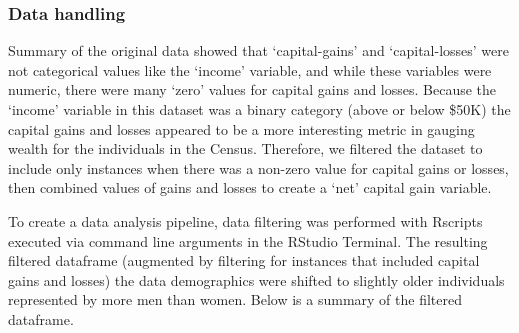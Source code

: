 \documentclass[]{article}
\begin{document}
\hypertarget{data-handling}{%
\subsubsection{Data handling}\label{data-handling}}

Summary of the original data showed that `capital-gains' and
`capital-losses' were not categorical values like the `income' variable,
and while these variables were numeric, there were many `zero' values
for capital gains and losses. Because the `income' variable in this
dataset was a binary category (above or below \$50K) the capital gains
and losses appeared to be a more interesting metric in gauging wealth
for the individuals in the Census. Therefore, we filtered the dataset to
include only instances when there was a non-zero value for capital gains
or losses, then combined values of gains and losses to create a `net'
capital gain variable.

To create a data analysis pipeline, data filtering was performed with
Rscripts executed via command line arguments in the RStudio Terminal.
The resulting filtered dataframe (augmented by filtering for instances
that included capital gains and losses) the data demographics were
shifted to slightly older individuals represented by more men than
women. Below is a summary of the filtered dataframe.
\end{document}
